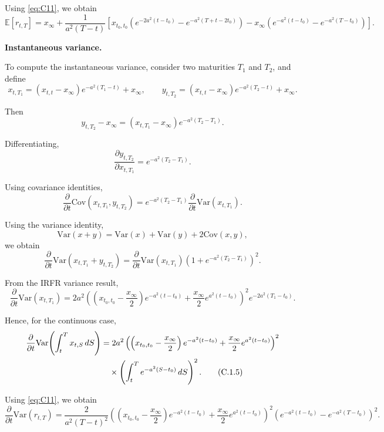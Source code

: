 \documentclass[12pt]{article}
\theoremstyle{statementstyle}
\begin{document}
\begin{appendices}
Using \eqref{eq:C11}, we obtain
\begin{equation}
\mathbb{E}[r_{t,T}]
=
x_\infty
+
\frac{1}{a^2(T-t)}
\left[
x_{t_0,t_0}
\left(
e^{-2a^2(t-t_0)}
-
e^{-a^2(T+t-2t_0)}
\right)
-
x_\infty
\left(
e^{-a^2(t-t_0)}
-
e^{-a^2(T-t_0)}
\right)
\right].
\tag{C.1.4}\label{eq:C14}
\end{equation}

\medskip
\noindent\textbf{Instantaneous variance.}

To compute the instantaneous variance, consider two maturities \(T_1\) and \(T_2\),
and define
\[
x_{t,T_1}
=
(x_{t,t}-x_\infty)e^{-a^2(T_1-t)} + x_\infty,
\qquad
y_{t,T_2}
=
(x_{t,t}-x_\infty)e^{-a^2(T_2-t)} + x_\infty.
\]

Then
\[
y_{t,T_2} - x_\infty
=
(x_{t,T_1}-x_\infty)e^{-a^2(T_2-T_1)}.
\]

Differentiating,
\[
\frac{\partial y_{t,T_2}}{\partial x_{t,T_1}}
=
e^{-a^2(T_2-T_1)}.
\]

Using covariance identities,
\[
\frac{\partial}{\partial t}
\mathrm{Cov}(x_{t,T_1},y_{t,T_2})
=
e^{-a^2(T_2-T_1)}
\frac{\partial}{\partial t}
\mathrm{Var}(x_{t,T_1}).
\]

Using the variance identity,
\[
\mathrm{Var}(x+y)
=
\mathrm{Var}(x)+\mathrm{Var}(y)+2\mathrm{Cov}(x,y),
\]
we obtain
\[
\frac{\partial}{\partial t}
\mathrm{Var}(x_{t,T_1}+y_{t,T_2})
=
\frac{\partial}{\partial t}
\mathrm{Var}(x_{t,T_1})
\left(1+e^{-a^2(T_2-T_1)}\right)^2.
\]

From the IRFR variance result,
\[
\frac{\partial}{\partial t}
\mathrm{Var}(x_{t,T_1})
=
2a^2
\left(
\left(x_{t_0,t_0}-\frac{x_\infty}{2}\right)e^{-a^2(t-t_0)}
+
\frac{x_\infty}{2}e^{a^2(t-t_0)}
\right)^2
e^{-2a^2(T_1-t_0)}.
\]

Hence, for the continuous case,
\begin{align}
\frac{\partial}{\partial t}
\mathrm{Var}\!\left(\int_t^T x_{t,S}\,dS\right)
&=
2a^2
\left(
\left(x_{t_0,t_0}-\frac{x_\infty}{2}\right)e^{-a^2(t-t_0)}
+
\frac{x_\infty}{2}e^{a^2(t-t_0)}
\right)^2 \notag \\
&\quad\times
\left(\int_t^T e^{-a^2(S-t_0)}\,dS\right)^2.
\tag{C.1.5}\label{eq:C15}
\end{align}

Using \eqref{eq:C11}, we obtain
\begin{equation}
\frac{\partial}{\partial t}\mathrm{Var}(r_{t,T})
=
\frac{2}{a^2(T-t)^2}
\left(
\left(x_{t_0,t_0}-\frac{x_\infty}{2}\right)e^{-a^2(t-t_0)}
+
\frac{x_\infty}{2}e^{a^2(t-t_0)}
\right)^2
\left(
e^{-a^2(t-t_0)}-e^{-a^2(T-t_0)}
\right)^2.
\tag{C.1.6}\label{eq:C16}
\end{equation}


\end{appendices}
\end{document}
